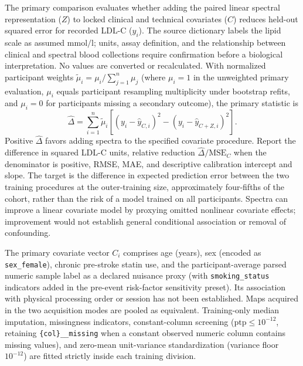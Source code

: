 \documentclass[preprint,12pt]{elsarticle}
\begin{document}
The primary comparison evaluates whether adding the paired linear spectral representation ($Z$) to locked clinical and technical covariates ($C$) reduces held-out squared error for recorded LDL-C ($y_i$). The source dictionary labels the lipid scale as assumed $\si{\milli\mole\per\litre}$; units, assay definition, and the relationship between clinical and spectral blood collections require confirmation before a biological interpretation. No values are converted or recalculated. With normalized participant weights $\tilde{\mu}_i = \mu_i / \sum_{j=1}^n \mu_j$ (where $\mu_i = 1$ in the unweighted primary evaluation, $\mu_i$ equals participant resampling multiplicity under bootstrap refits, and $\mu_i = 0$ for participants missing a secondary outcome), the primary statistic is
\begin{equation}
\widehat{\Delta} = \sum_{i=1}^{n} \tilde{\mu}_i \left[ (y_i - \widehat{y}_{C,i})^2 - (y_i - \widehat{y}_{C+Z,i})^2 \right].
\label{eq:delta_mse}
\end{equation}
Positive $\widehat{\Delta}$ favors adding spectra to the specified covariate procedure. Report the difference in squared LDL-C units, relative reduction $\widehat{\Delta}/\mathrm{MSE}_C$ when the denominator is positive, RMSE, MAE, and descriptive calibration intercept and slope. The target is the difference in expected prediction error between the two training procedures at the outer-training size, approximately four-fifths of the cohort, rather than the risk of a model trained on all participants. Spectra can improve a linear covariate model by proxying omitted nonlinear covariate effects; improvement would not establish general conditional association or removal of confounding.

The primary covariate vector $C_i$ comprises age (years), sex (encoded as \texttt{sex\_female}), chronic pre-stroke statin use, and the participant-average parsed numeric sample label as a declared nuisance proxy (with \texttt{smoking\_status} indicators added in the pre-event risk-factor sensitivity preset). Its association with physical processing order or session has not been established. Maps acquired in the two acquisition modes are pooled as equivalent. Training-only median imputation, missingness indicators, constant-column screening ($\mathrm{ptp} \le 10^{-12}$, retaining \texttt{\{col\}\_\_missing} when a constant observed numeric column contains missing values), and zero-mean unit-variance standardization (variance floor $10^{-12}$) are fitted strictly inside each training division.
\end{document}

